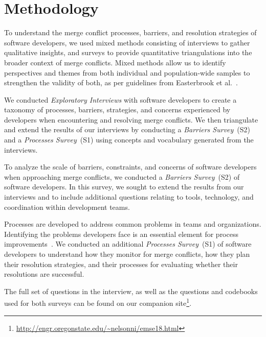 
\section{Methodology}\label{methodology}


To understand the merge conflict processes, barriers, and resolution strategies of software developers, we used mixed methods consisting of interviews to gather qualitative insights, and surveys to provide quantitative triangulations into the broader context of merge conflicts.
Mixed methods allow us to identify perspectives and themes from both individual and population-wide samples to strengthen the validity of both, as per guidelines from Easterbrook et al.~\cite{easterbrook2008selecting}.

We conducted \textit{Exploratory Interviews} with software developers to create a taxonomy of processes, barriers, strategies, and concerns experienced by developers when encountering and resolving merge conflicts.
We then triangulate and extend the results of our interviews by conducting a \textit{Barriers Survey}~(S2) and a \textit{Processes Survey}~(S1) using concepts and vocabulary generated from the interviews. 

To analyze the scale of barriers, constraints, and concerns of software developers when approaching merge conflicts, we conducted a \textit{Barriers Survey}~(S2) of software developers.
In this survey, we sought to extend the results from our interviews and to include additional questions relating to tools, technology, and coordination within development teams.

Processes are developed to address common problems in teams and organizations.
Identifying the problems developers face is an essential element for process improvements~\cite{beecham2003software}.
We conducted an additional \textit{Processes Survey}~(S1) of software developers to understand how they monitor for merge conflicts, how they plan their resolution strategies, and their processes for evaluating whether their resolutions are successful.

The full set of questions in the interview, as well as the questions and codebooks used for both surveys can be found on our companion site\footnote{\url{http://engr.oregonstate.edu/~nelsonni/emse18.html}}.

